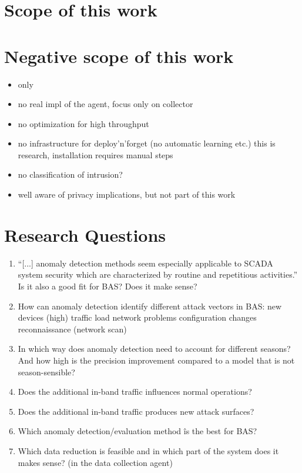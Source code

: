 \section{Scope of this work}

\section{Negative scope of this work}
\begin{itemize}
	\item only \knx
	\item no real impl of the agent, focus only on collector
	\item no optimization for high throughput
	\item no infrastructure for deploy'n'forget (no automatic learning etc.)
		\subitem this is research, installation requires manual steps
	\item no classification of intrusion?
	\item well aware of privacy implications, but not part of this work
\end{itemize}

\section{Research Questions}

\begin{enumerate}
	\item \enquote{[...] anomaly detection methods seem especially applicable to SCADA system security which are characterized by routine and repetitious activities.} \parencite{Yang2006} Is it also a good fit for BAS? Does it make sense?
	\item How can anomaly detection identify different attack vectors in BAS:
		\subitem new devices
		\subitem (high) traffic load
		\subitem network problems
		\subitem configuration changes
		\subitem reconnaissance (network scan) 
	\item In which way does anomaly detection need to account for different seasons? And how high is the precision improvement compared to a model that is not season-sensible?
	\item Does the additional in-band traffic influences normal operations?
	\item Does the additional in-band traffic produces new attack surfaces?
	\item Which anomaly detection/evaluation method îs the best for BAS?
	\item Which data reduction is feasible and in which part of the system does it makes sense? (in the data collection agent)
\end{enumerate}